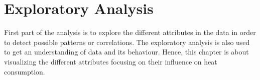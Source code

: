 \chapter{Exploratory Analysis}
First part of the analysis is to explore the different attributes in the data in order to detect possible patterns or correlations. The exploratory analysis is also used to get an understanding of data and its behaviour. Hence, this chapter is about visualizing the different attributes focusing on their influence on heat consumption. 



